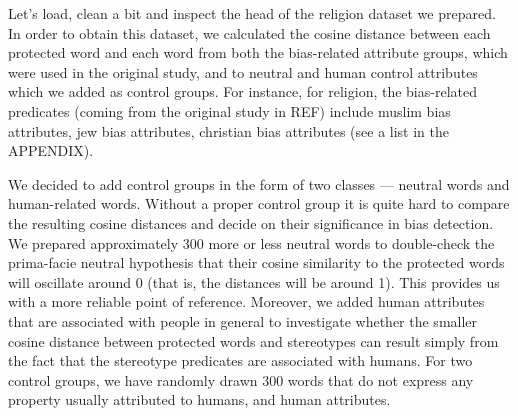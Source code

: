 \documentclass[
  12pt,
]{book}
\begin{document}
Let's load, clean a bit and inspect the head of the religion dataset we prepared. In order to obtain this dataset, we calculated the cosine distance between each protected word and each word from both the bias-related attribute groups, which were used in the original study, and to neutral and human control attributes which we added as control groups. For instance, for religion, the bias-related predicates (coming from the original study in REF) include muslim bias attributes, jew bias attributes, christian bias attributes (see a list in the APPENDIX).

We decided to add control groups in the form of two classes --- neutral words and human-related words. Without a proper control group it is quite hard to compare the resulting cosine distances and decide on their significance in bias detection. We prepared approximately 300 more or less neutral words to double-check the prima-facie neutral hypothesis that their cosine similarity to the protected words will oscillate around 0 (that is, the distances will be around 1). This provides us with a more reliable point of reference. Moreover, we added human attributes that are associated with people in general to investigate whether the smaller cosine distance between protected words and stereotypes can result simply from the fact that the stereotype predicates are associated with humans. For two control groups, we have randomly drawn 300 words that do not express any property usually attributed to humans, and human attributes. 

\vspace{1mm}
\footnotesize
\end{document}
